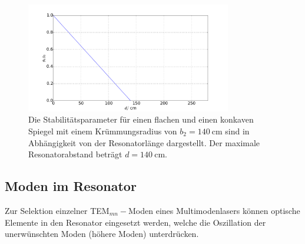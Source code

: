 \begin{figure}
    \centering
    \includegraphics[width=0.8\textwidth]{plots/stability2.pdf}
    \caption{Die Stabilitätsparameter für einen flachen und einen konkaven Spiegel mit einem Krümmungsradius von $b_2 = \SI{140}{\centi\meter}$ sind in Abhängigkeit von der Resonatorlänge dargestellt. Der maximale Resonatorabstand beträgt $d = \SI{140}{\centi\meter}$.}
    \label{fig:stability2}
\end{figure}

\subsection{Moden im Resonator}
\label{sec:model}

Zur Selektion einzelner TEM$_{mn}-$Moden eines Multimodenlasers können optische Elemente in den Resonator eingesetzt werden, welche die Oszillation der unerwünschten Moden (höhere Moden) unterdrücken.

